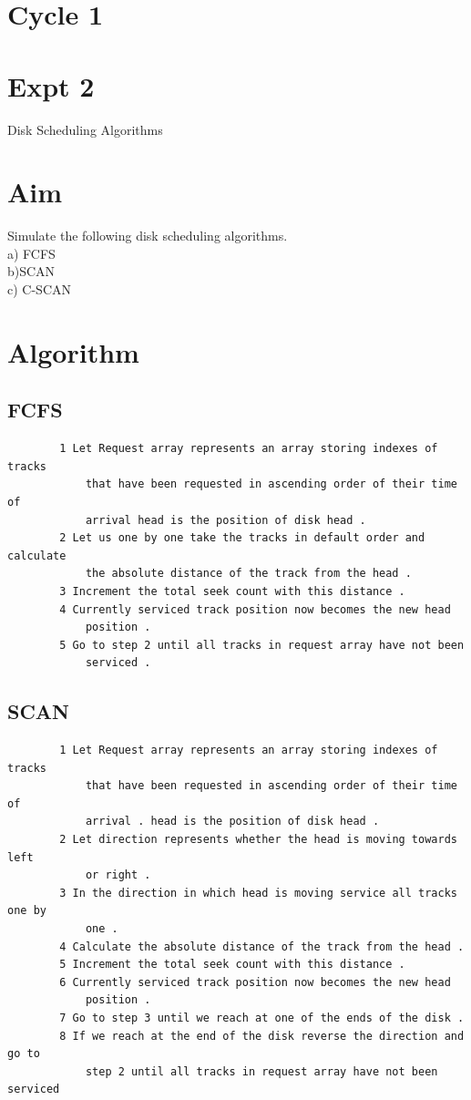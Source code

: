 \documentclass[13pt,oneside]{book}
\begin{document}
\section*{Cycle 1}
\section*{Expt 2}
\begin{center}
    \Large{Disk Scheduling Algorithms}
\end{center}
\section*{Aim}
\large
Simulate the following disk scheduling algorithms.\\
a) FCFS\\
b)SCAN \\
c) C-SCAN \\

\section*{Algorithm}
    \subsection*{FCFS}
    \begin{verbatim}
        1 Let Request array represents an array storing indexes of tracks
            that have been requested in ascending order of their time of
            arrival head is the position of disk head .
        2 Let us one by one take the tracks in default order and calculate
            the absolute distance of the track from the head .
        3 Increment the total seek count with this distance .
        4 Currently serviced track position now becomes the new head
            position .
        5 Go to step 2 until all tracks in request array have not been
            serviced .
    \end{verbatim}  
    \subsection*{SCAN}
    \begin{verbatim}
        1 Let Request array represents an array storing indexes of tracks
            that have been requested in ascending order of their time of
            arrival . head is the position of disk head .
        2 Let direction represents whether the head is moving towards left
            or right .
        3 In the direction in which head is moving service all tracks one by
            one .
        4 Calculate the absolute distance of the track from the head .
        5 Increment the total seek count with this distance .
        6 Currently serviced track position now becomes the new head
            position .
        7 Go to step 3 until we reach at one of the ends of the disk .
        8 If we reach at the end of the disk reverse the direction and go to
            step 2 until all tracks in request array have not been serviced
    \end{verbatim}
\end{document}
